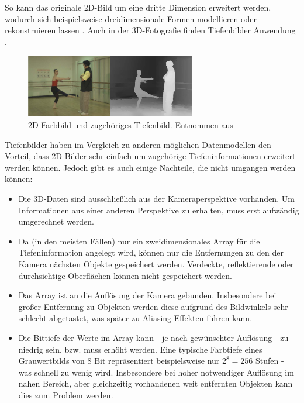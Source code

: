 So kann das originale 2D-Bild um eine dritte Dimension erweitert werden, wodurch sich beispielsweise dreidimensionale Formen modellieren oder rekonstruieren lassen \cite{arsalan2017synthesizing}.
Auch in der 3D-Fotografie finden Tiefenbilder Anwendung \cite{redert2006philips}.

\begin{figure}[ht]
	\centering
	\includegraphics[width=0.66\textwidth]{images/depth_map.png}
	\caption{2D-Farbbild und zugehöriges Tiefenbild. Entnommen aus \cite[S.649]{muller2010depth}}
	\label{fig:depth_map}
\end{figure}

Tiefenbilder haben im Vergleich zu anderen möglichen Datenmodellen den Vorteil, dass 2D-Bilder sehr einfach um zugehörige Tiefeninformationen erweitert werden können.
Jedoch gibt es auch einige Nachteile, die nicht umgangen werden können:

\begin{itemize}
\item Die 3D-Daten sind ausschließlich aus der Kameraperspektive vorhanden.
Um Informationen aus einer anderen Perspektive zu erhalten, muss erst aufwändig umgerechnet werden.
\item Da (in den meisten Fällen) nur ein zweidimensionales Array für die Tiefeninformation angelegt wird, können nur die Entfernungen zu den der Kamera nächsten Objekte gespeichert werden.
Verdeckte, reflektierende oder durchsichtige Oberflächen können nicht gespeichert werden.
\item Das Array ist an die Auflösung der Kamera gebunden.
Insbesondere bei großer Entfernung zu Objekten werden diese aufgrund des Bildwinkels sehr schlecht abgetastet, was später zu Aliasing-Effekten führen kann.
\item Die Bittiefe der Werte im Array kann - je nach gewünschter Auflösung - zu niedrig sein, bzw. muss erhöht werden.
Eine typische Farbtiefe eines Grauwertbilds von 8 Bit repräsentiert beispielsweise nur $2^8 = 256$ Stufen - was schnell zu wenig wird.
Insbesondere bei hoher notwendiger Auflösung im nahen Bereich, aber gleichzeitig vorhandenen weit entfernten Objekten kann dies zum Problem werden.
\end{itemize}



